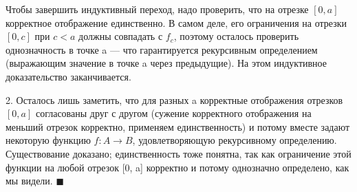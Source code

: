 Чтобы завершить индуктивный переход, надо проверить, что на отрезке $[0, a]$ корректное отображение единственно. В самом деле, его ограничения на отрезки $[0, c]$ при $c < a$ должны совпадать с $f_c$, поэтому осталось проверить однозначность в точке a — что гарантируется рекурсивным определением (выражающим значение в точке a через предыдущие). На этом индуктивное доказательство заканчивается.

2. Осталось лишь заметить, что для разных a корректные отображения отрезков $[0, a]$ согласованы друг с другом (сужение корректного отображения на меньший отрезок корректно, применяем единственность) и потому вместе задают некоторую функцию $f : A \rightarrow B$, удовлетворяющую рекурсивному определению. Существование доказано; единственность тоже понятна, так как ограничение этой функции на любой отрезок [0, a] корректно и потому однозначно определено, как мы видели.
$\blacksquare$